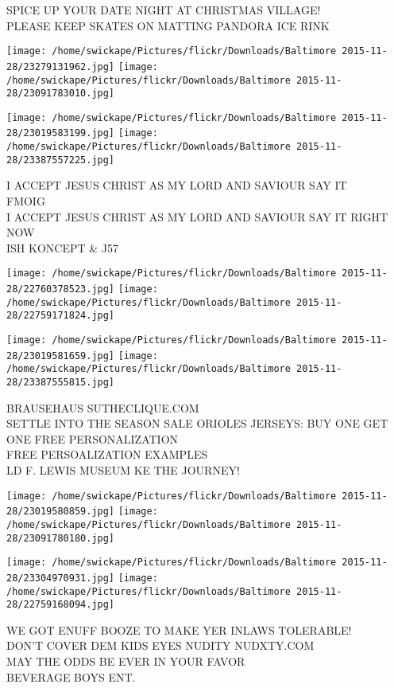 \documentclass[10pt,letterpaper]{article}
\begin{document}
SPICE UP YOUR DATE NIGHT AT CHRISTMAS VILLAGE!\\
PLEASE KEEP SKATES ON MATTING PANDORA ICE RINK
\pagebreak

\texttt{[image: /home/swickape/Pictures/flickr/Downloads/Baltimore 2015-11-28/23279131962.jpg]}
\texttt{[image: /home/swickape/Pictures/flickr/Downloads/Baltimore 2015-11-28/23091783010.jpg]}

\texttt{[image: /home/swickape/Pictures/flickr/Downloads/Baltimore 2015-11-28/23019583199.jpg]}
\texttt{[image: /home/swickape/Pictures/flickr/Downloads/Baltimore 2015-11-28/23387557225.jpg]}

I ACCEPT JESUS CHRIST AS MY LORD AND SAVIOUR SAY IT\\
FMOIG\\
I ACCEPT JESUS CHRIST AS MY LORD AND SAVIOUR SAY IT RIGHT NOW\\
ISH KONCEPT \& J57
\pagebreak

\texttt{[image: /home/swickape/Pictures/flickr/Downloads/Baltimore 2015-11-28/22760378523.jpg]}
\texttt{[image: /home/swickape/Pictures/flickr/Downloads/Baltimore 2015-11-28/22759171824.jpg]}

\texttt{[image: /home/swickape/Pictures/flickr/Downloads/Baltimore 2015-11-28/23019581659.jpg]}
\texttt{[image: /home/swickape/Pictures/flickr/Downloads/Baltimore 2015-11-28/23387555815.jpg]}

BRAUSEHAUS SUTHECLIQUE.COM\\
SETTLE INTO THE SEASON SALE ORIOLES JERSEYS: BUY ONE GET ONE FREE PERSONALIZATION\\
FREE PERSOALIZATION EXAMPLES\\
LD F. LEWIS MUSEUM KE THE JOURNEY!
\pagebreak

\texttt{[image: /home/swickape/Pictures/flickr/Downloads/Baltimore 2015-11-28/23019580859.jpg]}
\texttt{[image: /home/swickape/Pictures/flickr/Downloads/Baltimore 2015-11-28/23091780180.jpg]}

\texttt{[image: /home/swickape/Pictures/flickr/Downloads/Baltimore 2015-11-28/23304970931.jpg]}
\texttt{[image: /home/swickape/Pictures/flickr/Downloads/Baltimore 2015-11-28/22759168094.jpg]}

WE GOT ENUFF BOOZE TO MAKE YER INLAWS TOLERABLE!\\
DON'T COVER DEM KIDS EYES NUDITY NUDXTY.COM\\
MAY THE ODDS BE EVER IN YOUR FAVOR\\
BEVERAGE BOYS ENT.
\pagebreak
\end{document}
